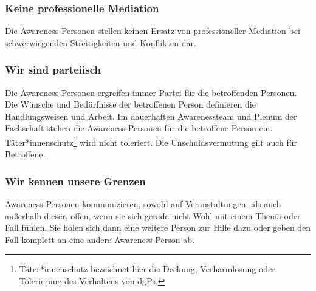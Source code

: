 \documentclass{article}
\begin{document}
\subsubsection{Keine professionelle Mediation}
Die Awareness-Personen stellen keinen Ersatz von professioneller Mediation bei schwerwiegenden Streitigkeiten und Konflikten dar. 

\subsubsection{Wir sind parteiisch}
Die Awareness-Personen ergreifen immer Partei für die betroffenden Personen. Die Wünsche und Bedürfnisse der betroffenen Person definieren die Handlungsweisen und Arbeit. Im 
dauerhaften Awarenessteam und Plenum der Fachschaft stehen die Awareness-Personen für die betroffene Person ein. 
Täter*innenschutz\footnote{Täter*innenschutz bezeichnet hier die Deckung, Verharmlosung oder Tolerierung des Verhaltens von dgPs.} wird nicht toleriert. Die Unschuldsvermutung 
gilt auch für Betroffene.

\subsubsection{Wir kennen unsere Grenzen}
Awareness-Personen kommunizieren, sowohl auf Veranstaltungen, als auch außerhalb dieser, offen, wenn sie sich gerade nicht Wohl mit einem Thema oder Fall fühlen. Sie holen 
sich dann eine weitere Person zur Hilfe dazu oder geben den Fall komplett an eine andere Awareness-Person ab. 
\end{document}
